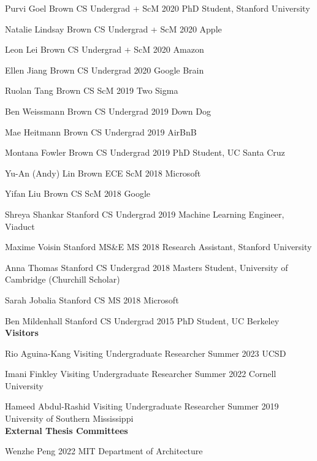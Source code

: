 \documentclass[line,margin]{res}
\begin{document}
\begin{resume}
\alumni
{Purvi Goel}
{Brown CS Undergrad + ScM}
{2020}
{PhD Student, Stanford University}

\alumni
{Natalie Lindsay}
{Brown CS Undergrad + ScM}
{2020}
{Apple}

\alumni
{Leon Lei}
{Brown CS Undergrad + ScM}
{2020}
{Amazon}

\alumni
{Ellen Jiang}
{Brown CS Undergrad}
{2020}
{Google Brain}

\alumni
{Ruolan Tang}
{Brown CS ScM}
{2019}
{Two Sigma}

\alumni
{Ben Weissmann}
{Brown CS Undergrad}
{2019}
{Down Dog}

\alumni
{Mae Heitmann}
{Brown CS Undergrad}
{2019}
{AirBnB}

\alumni
{Montana Fowler}
{Brown CS Undergrad}
{2019}
{PhD Student, UC Santa Cruz}

\alumni
{Yu-An (Andy) Lin}
{Brown ECE ScM}
{2018}
{Microsoft}

\alumni
{Yifan Liu}
{Brown CS ScM}
{2018}
{Google}

\alumni
{Shreya Shankar}
{Stanford CS Undergrad}
{2019}
{Machine Learning Engineer, Viaduct}

\alumni
{Maxime Voisin}
{Stanford MS\&E MS}
{2018}
{Research Assistant, Stanford University}

\alumni
{Anna Thomas}
{Stanford CS Undergrad}
{2018}
{Masters Student, University of Cambridge (Churchill Scholar)}

\alumni
{Sarah Jobalia}
{Stanford CS MS}
{2018}
{Microsoft}

\alumni
{Ben Mildenhall}
{Stanford CS Undergrad}
{2015}
{PhD Student, UC Berkeley}
\\


\textbf{Visitors}

\visitor
{Rio Aguina-Kang}
{Visiting Undergraduate Researcher}
{Summer 2023}
{UCSD}

\visitor
{Imani Finkley}
{Visiting Undergraduate Researcher}
{Summer 2022}
{Cornell University}

\visitor
{Hameed Abdul-Rashid}
{Visiting Undergraduate Researcher}
{Summer 2019}
{University of Southern Mississippi}
\\


\textbf{External Thesis Committees}

\thesiscomm
{Wenzhe Peng}
{2022}
{MIT Department of Architecture}


\end{resume}
\end{document}
